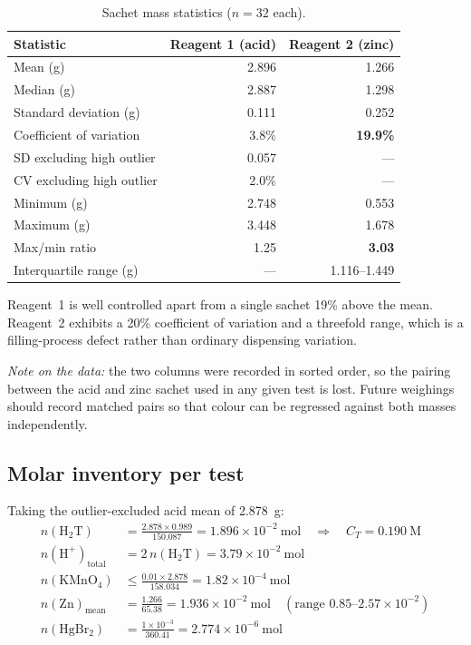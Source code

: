 \documentclass[11pt,a4paper]{article}
\begin{document}
\begin{table}[h]
\centering
\caption{Sachet mass statistics ($n=32$ each).}
\begin{tabular}{lrr}
\toprule
Statistic & Reagent 1 (acid) & Reagent 2 (zinc) \\
\midrule
Mean (g)                    & 2.896 & 1.266 \\
Median (g)                  & 2.887 & 1.298 \\
Standard deviation (g)      & 0.111 & 0.252 \\
Coefficient of variation    & 3.8\% & \textbf{19.9\%} \\
SD excluding high outlier   & 0.057 & --- \\
CV excluding high outlier   & 2.0\% & --- \\
Minimum (g)                 & 2.748 & 0.553 \\
Maximum (g)                 & 3.448 & 1.678 \\
Max/min ratio               & 1.25  & \textbf{3.03} \\
Interquartile range (g)     & ---   & 1.116--1.449 \\
\bottomrule
\end{tabular}
\end{table}

Reagent~1 is well controlled apart from a single sachet 19\% above the mean.
Reagent~2 exhibits a 20\% coefficient of variation and a threefold range,
which is a filling-process defect rather than ordinary dispensing variation.

\emph{Note on the data:} the two columns were recorded in sorted order, so
the pairing between the acid and zinc sachet used in any given test is lost.
Future weighings should record matched pairs so that colour can be regressed
against both masses independently.

\subsection{Molar inventory per test}

Taking the outlier-excluded acid mean of 2.878~g:
\begin{align}
  n(\mathrm{H_2T}) &= \frac{2.878 \times 0.989}{150.087}
     = 1.896\times10^{-2}\ \mathrm{mol}
     \quad\Rightarrow\quad C_T = 0.190\ \mathrm{M} \\
  n(\mathrm{H^+})_{\text{total}} &= 2\,n(\mathrm{H_2T})
     = 3.79\times10^{-2}\ \mathrm{mol}\\
  n(\mathrm{KMnO_4}) &\leq \frac{0.01 \times 2.878}{158.034}
     = 1.82\times10^{-4}\ \mathrm{mol}\\
  n(\mathrm{Zn})_{\text{mean}} &= \frac{1.266}{65.38}
     = 1.936\times10^{-2}\ \mathrm{mol}
     \quad (\text{range } 0.85\text{--}2.57\times10^{-2})\\
  n(\mathrm{HgBr_2}) &= \frac{1\times10^{-3}}{360.41}
     = 2.774\times10^{-6}\ \mathrm{mol}
\end{align}
\end{document}

